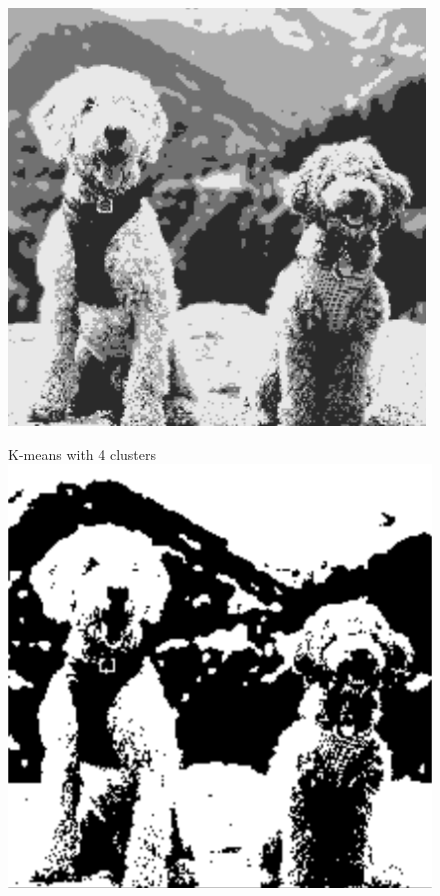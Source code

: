 \documentclass[11pt]{article}
\begin{document}
\begin{figure}[!htb]
\begin{center}
\begin{multicols}{4}
	\includegraphics[width = \linewidth]{kmeans}\par
    K-means with 4 clusters
	\includegraphics[width = \linewidth]{thresh1}\par

\end{multicols}
\end{center}
\end{figure}
\end{document}
